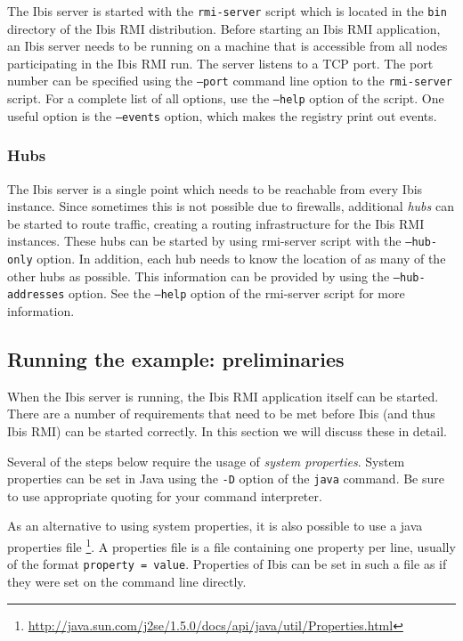 \documentclass[a4paper,10pt]{article}
\begin{document}
The Ibis server is started with the \texttt{rmi-server} script which is
located in the \texttt{bin} directory of the Ibis RMI distribution.  Before
starting an Ibis RMI application, an Ibis server needs to be running on a
machine that is accessible from all nodes participating in the Ibis RMI run.
The server listens to a TCP port. The port number can be specified using
the \texttt{--port} command line option to the \texttt{rmi-server}
script.  For a complete list of all options, use the \texttt{--help}
option of the script. One useful option is the  \texttt{--events}
option, which makes the registry print out events.

\subsubsection{Hubs}
\label{hubs}

The Ibis server is a single point which needs to be reachable from every
Ibis instance. Since sometimes this is not possible due to firewalls,
additional \emph{hubs} can be started to route traffic, creating a
routing infrastructure for the Ibis RMI instances. These hubs can be started
by using rmi-server script with the \texttt{--hub-only} option. In
addition, each hub needs to know the location of as many of the other
hubs as possible. This information can be provided by using the
\texttt{--hub-addresses} option. See the \texttt{--help} option of the
rmi-server script for more information.

\subsection{Running the example: preliminaries}

When the Ibis server is running, the Ibis RMI application itself can be
started.  There are a number of requirements that need to be met before
Ibis (and thus Ibis RMI) can be started correctly.
In this section we will discuss these in detail.

Several of the steps below require the usage of \emph{system properties}.
System properties can be set in Java using the \texttt{-D} option of the
\texttt{java} command. Be sure to use appropriate quoting for your
command interpreter.

As an alternative to using system properties, it is also possible to use
a java properties file
\footnote{\url{http://java.sun.com/j2se/1.5.0/docs/api/java/util/Properties.html}}.
A properties file is a file containing one property per line, usually of
the format \texttt{property = value}. Properties of Ibis can be set in
such a file as if they were set on the command line directly.
\end{document}
